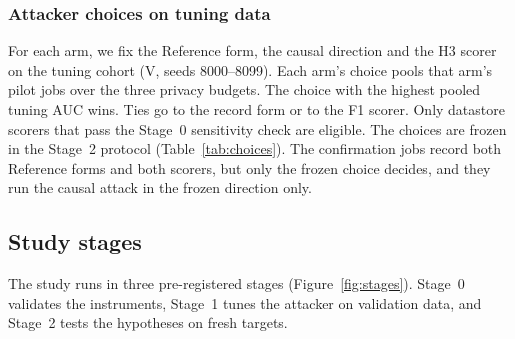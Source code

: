 \documentclass[11pt]{article}
\begin{document}
\subsubsection{Attacker choices on tuning data}\label{sec:attacker-choice}

For each arm, we fix the Reference form, the causal direction and the H3 scorer on the tuning cohort (V, seeds 8000--8099). Each arm's choice pools that arm's pilot jobs over the three privacy budgets. The choice with the highest pooled tuning AUC wins. Ties go to the record form or to the F1 scorer. Only datastore scorers that pass the Stage~0 sensitivity check are eligible. The choices are frozen in the Stage~2 protocol (Table~\ref{tab:choices}). The confirmation jobs record both Reference forms and both scorers, but only the frozen choice decides, and they run the causal attack in the frozen direction only.

\subsection{Study stages}\label{sec:stages}

The study runs in three pre-registered stages (Figure~\ref{fig:stages}). Stage~0 validates the instruments, Stage~1 tunes the attacker on validation data, and Stage~2 tests the hypotheses on fresh targets.
\end{document}
